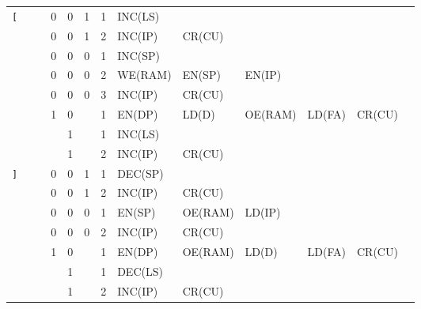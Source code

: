 \begin{footnotesize}
\begin{longtable}[c] {c|ccccc|c|llllll}
    \rowcolor{Gray}  \texttt{[}   &   &   & 0 & 0     & 1    & 1     & INC(LS)  &          &         &        &        &        \\
    \rowcolor{Gray}               &   &   & 0 & 0     & 1    & 2     & INC(IP)  & CR(CU)   &         &        &        &        \\      
    \rowcolor{White}              &   &   & 0 & 0     & 0    & 1     & INC(SP)  &          &         &        &        &        \\
    \rowcolor{White}              &   &   & 0 & 0     & 0    & 2     & WE(RAM)  & EN(SP)   & EN(IP)  &        &        &        \\
    \rowcolor{White}              &   &   & 0 & 0     & 0    & 3     & INC(IP)  & CR(CU)   &         &        &        &        \\
    \rowcolor{Gray}               &   &   & 1 & 0     &      & 1     & EN(DP)   & LD(D)    & OE(RAM) & LD(FA) & CR(CU) &        \\
    \rowcolor{White}              &   &   &   & 1     &      & 1     & INC(LS)  &          &         &        &        &        \\
    \rowcolor{White}              &   &   &   & 1     &      & 2     & INC(IP)  & CR(CU)   &         &        &        &        \\ \hline
    
    \rowcolor{Gray} \texttt{]}   &   &   & 0 & 0     & 1    & 1     & DEC(SP)  &          &         &        &        &        \\
    \rowcolor{Gray}              &   &   & 0 & 0     & 1    & 2     & INC(IP)  & CR(CU)   &         &        &        &        \\
        
    \rowcolor{White}               &   &   & 0 & 0     & 0    & 1     & EN(SP)   & OE(RAM)  & LD(IP)  &        &        &        \\
    \rowcolor{White}               &   &   & 0 & 0     & 0    & 2     & INC(IP)  & CR(CU)   &         &        &        &        \\
    \rowcolor{Gray}              &   &   & 1 & 0     &      & 1     & EN(DP)   & OE(RAM)  & LD(D)   & LD(FA) & CR(CU) &        \\
    \rowcolor{White}               &   &   &   & 1     &      & 1     & DEC(LS)  &          &         &        &        &        \\ 
    \rowcolor{White}               &   &   &   & 1     &      & 2     & INC(IP)  & CR(CU)   &         &        &        &        \\ \hline


\end{longtable}
\end{footnotesize}
